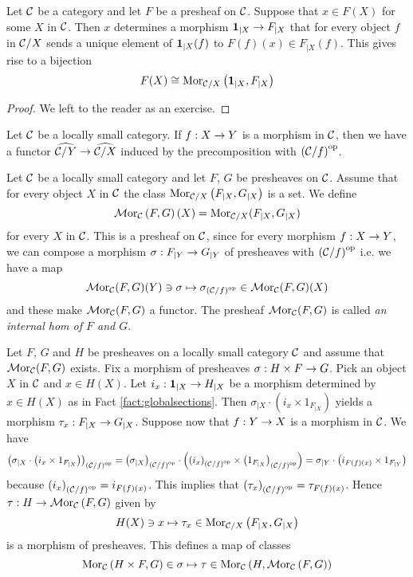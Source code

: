 \begin{fact}\label{fact:globalsections}
Let ${\mathcal C}$ be a category and let $F$ be a presheaf on ${\mathcal C}$. Suppose that $x\in F(X)$ for some $X$ in ${\mathcal C}$. Then $x$ determines a morphism $\mathbf{1}_{\mid X}\rightarrow F_{\mid X}$ that for every object $f$ in ${\mathcal C}/X$ sends a unique element of $\mathbf{1}_{\mid X}(f)$ to $F(f)(x)\in F_{\mid X}(f)$. This gives rise to a bijection
$$F(X)\cong \mathrm{Mor}_{{\mathcal C}/X}\left(\mathbf{1}_{\mid X},F_{\mid X}\right)$$
\end{fact}
\begin{proof}
We left to the reader as an exercise.
\end{proof}
\noindent
Let ${\mathcal C}$ be a locally small category. If $f:X\rightarrow Y$ is a morphism in ${\mathcal C}$, then we have a functor $\widehat{{\mathcal C}/Y}\rightarrow \widehat{{\mathcal C}/X}$ induced by the precomposition with $\left({\mathcal C}/f\right)^{\mathrm{op}}$.

\begin{definition}
Let ${\mathcal C}$ be a locally small category and let $F$, $G$ be presheaves on ${\mathcal C}$. Assume that for every object $X$ in ${\mathcal C}$ the class $\mathrm{Mor}_{{\mathcal C}/X}\left(F_{\mid X},G_{\mid X}\right)$ is a set. We define
$$\mathcal{M}\mathrm{or}_{{\mathcal C}}\left(F,G\right)(X) = \mathrm{Mor}_{{\mathcal C}/X}(F_{\mid X},G_{\mid X})$$
for every $X$ in ${\mathcal C}$. This is a presheaf on ${\mathcal C}$, since for every morphism $f:X\rightarrow Y$, we can compose a morphism $\sigma:F_{\mid Y}\rightarrow G_{\mid Y}$ of presheaves with $\left({\mathcal C}/f\right)^{\mathrm{op}}$ i.e. we have a map 
$$\mathcal{M}\mathrm{or}_{{\mathcal C}}(F,G)(Y)\ni \sigma \mapsto \sigma_{\left({\mathcal C}/f\right)^{\mathrm{op}}}\in \mathcal{M}\mathrm{or}_{{\mathcal C}}(F,G)(X)$$
and these make $\mathcal{M}\mathrm{or}_{{\mathcal C}}(F,G)$ a functor. The presheaf $\mathcal{M}\mathrm{or}_{{\mathcal C}}(F,G)$ is called \textit{an internal hom of $F$ and $G$}.
\end{definition}
\noindent
Let $F$, $G$ and $H$ be presheaves on a locally small category ${\mathcal C}$ and assume that $\mathcal{M}\mathrm{or}_{{\mathcal C}}(F,G)$ exists. Fix a morphism of presheaves $\sigma:H\times F\rightarrow G$. Pick an object $X$ in ${\mathcal C}$ and $x\in H(X)$. Let $i_x:\mathbf{1}_{\mid X}\rightarrow H_{\mid X}$ be a morphism determined by $x\in H(X)$ as in Fact \ref{fact:globalsections}. Then $\sigma_{\mid X}\cdot \left(i_x\times 1_{F_{\mid X}}\right)$ yields a morphism $\tau_x:F_{\mid X}\rightarrow G_{\mid X}$. Suppose now that $f:Y\rightarrow X$ is a morphism in ${\mathcal C}$. We have 
$$\left(\sigma_{\mid X}\cdot \left(i_{x}\times 1_{F_{\mid X}}\right)\right)_{\left({\mathcal C}/f\right)^{\mathrm{op}}} = \left(\sigma_{\mid X}\right)_{\left({\mathcal C}/f\right)^{\mathrm{op}}}\cdot \left(\left(i_x\right)_{\left({\mathcal C}/f\right)^{\mathrm{op}}}\times \left(1_{F_{\mid X}}\right)_{\left({\mathcal C}/f\right)^{\mathrm{op}}}\right) = \sigma_{\mid Y}\cdot \left(i_{F(f)(x)}\times 1_{F_{\mid Y}}\right)$$
because $\left(i_x\right)_{\left({\mathcal C}/f\right)^{\mathrm{op}}} = i_{F(f)(x)}$. This implies that $\left(\tau_x\right)_{\left({\mathcal C}/f\right)^{\mathrm{op}}} = \tau_{F(f)(x)}$. Hence $\tau:H\rightarrow \mathcal{M}\mathrm{or}_{{\mathcal C}}\left(F,G\right)$ given by 
$$H(X)\ni x\mapsto \tau_x\in \mathrm{Mor}_{{\mathcal C}/X}\left(F_{\mid X},G_{\mid X}\right)$$
is a morphism of presheaves. This defines a map of classes
$$\mathrm{Mor}_{{\mathcal C}}\left(H\times F, G\right)\in \sigma \mapsto \tau \in \mathrm{Mor}_{{\mathcal C}}\left(H,\mathcal{M}\mathrm{or}_{{\mathcal C}}\left(F,G\right)\right)$$

